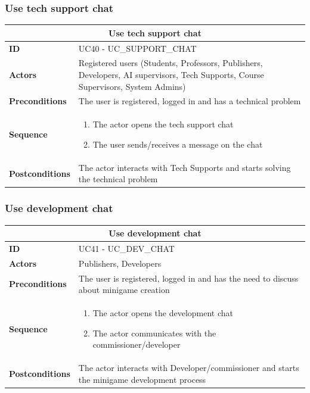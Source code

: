 \subsubsection{Use tech support chat}
\begin{tabular}{|m{2.5cm}|m{8cm}|}
	\hline
	\multicolumn{2}{|c|}{Use tech support chat} \\
	\hline
	\textbf{ID} & UC40 - UC\_SUPPORT\_CHAT \\
	\hline
	\textbf{Actors} & Registered users (Students, Professors, Publishers, Developers, AI supervisors, Tech Supports, Course Supervisors, System Admins) \\
	\hline
	\textbf{Preconditions} & The user is registered, logged in and has a technical problem \\
	\hline
	\textbf{Sequence} & 
	\begin{enumerate}
		\item The actor opens the tech support chat
		\item The user sends/receives a message on the chat
	\end{enumerate} \\
	\hline
	\textbf{Postconditions} & The actor interacts with Tech Supports and starts solving the technical problem \\
	\hline
\end{tabular}

\subsubsection{Use development chat}
\begin{tabular}{|m{2.5cm}|m{8cm}|}
	\hline
	\multicolumn{2}{|c|}{Use development chat} \\
	\hline
	\textbf{ID} & UC41 - UC\_DEV\_CHAT \\
	\hline
	\textbf{Actors} & Publishers, Developers \\
	\hline
	\textbf{Preconditions} & The user is registered, logged in and has the need to discuss about minigame creation \\
	\hline
	\textbf{Sequence} & 
	\begin{enumerate}
		\item The actor opens the development chat
		\item The actor communicates with the commissioner/developer
	\end{enumerate} \\
	\hline
	\textbf{Postconditions} & The actor interacts with Developer/commissioner and starts the minigame development process \\
	\hline
\end{tabular}

